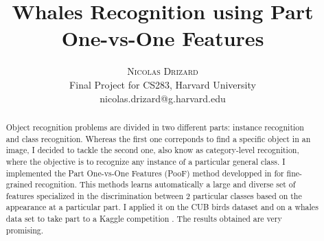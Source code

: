 \documentclass[twoside]{article}
\title{\vspace{-15mm}\fontsize{24pt}{10pt}\selectfont\textbf{Whales Recognition using Part One-vs-One Features}} %
\author{
\large
\textsc{Nicolas Drizard}\\[2mm] %
\normalsize Final Project for CS283, Harvard University \\ %
\normalsize {nicolas.drizard@g.harvard.edu} %
\vspace{-5mm}
}
\date{}
\begin{document}
\maketitle %

\thispagestyle{fancy} %


\begin{abstract}

\noindent

Object recognition problems are divided in two different parts: instance recognition and class recognition. Whereas the first one correponds to find a specific object in an image, I decided to tackle the second one, also know as category-level recognition, where the objective is to recognize any instance of a particular general class. I implemented the Part One-vs-One Features (PooF) method developped in \cite{poof} for fine-grained recognition. This methods learns automatically a large and diverse set of features specialized in the discrimination between 2 particular classes based on the appearance at a particular part. I applied it on the CUB birds dataset \cite{cub} and on a whales data set to take part to a Kaggle competition \cite{kag}. The results obtained are very promising.

\end{abstract}

\end{document}
